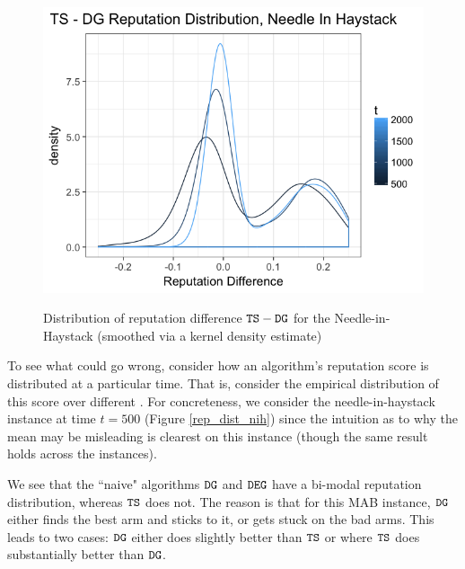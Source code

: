 \documentclass[../competing_bandits.tex]{subfiles}
\begin{document}
\begin{figure}[ht]
\caption{Distribution of reputation difference $\mathtt{TS}-\mathtt{DG}$ for the Needle-in-Haystack (smoothed via a kernel density estimate)}
\includegraphics[scale=0.35]{figures/ts_dg_rep_diff_nih}
\label{ts_dg_rep_diff_nih}
\end{figure}

To see what could go wrong, consider how an algorithm's reputation score is distributed at a particular time. That is, consider the empirical distribution of this score over different \MRVs. For concreteness, we consider the needle-in-haystack instance at time $t=500$ (Figure \ref{rep_dist_nih}) since the intuition as to why the mean may be misleading is clearest on this instance (though the same result holds across the instances).

We see that the ``naive" algorithms $\mathtt{DG}$ and $\mathtt{DEG}$ have a bi-modal reputation distribution, whereas $\mathtt{TS}$ does not. The reason is that for this MAB instance, $\mathtt{DG}$ either finds the best arm and sticks to it, or gets stuck on the bad arms. This leads to two cases: $\mathtt{DG}$ either does slightly better than $\mathtt{TS}$ or where $\mathtt{TS}$ does substantially better than $\mathtt{DG}$.
\end{document}
